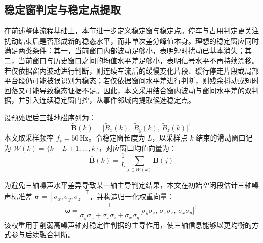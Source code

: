 \documentclass{xdupgthesis}
\begin{document}
\subsection{稳定窗判定与稳定点提取}
\label{subsec:ch4_stable}

在前述整体流程基础上，本节进一步定义稳定窗与稳定点。停车与占用判定更关注扰动结束后是否形成新的稳态水平，而非单次差分峰值本身。理想的稳定窗应同时满足两类条件：其一，当前窗口内部波动足够小，表明短时扰动已基本消失；其二，当前窗口与历史窗口之间的均值水平差足够小，表明信号水平不再持续漂移。若仅依据窗内波动进行判断，则连续车流后的缓慢变化片段、缓行停走片段或局部平台段仍可能被误识别为稳态；若仅依据窗间水平差进行判断，则残余抖动或短时回落又可能导致稳态证据不足。因此，本文采用结合窗内波动与窗间水平差的双判据，并引入连续稳定窗门控，从事件邻域内提取候选稳定点。

设预处理后三轴地磁序列为：
\begin{equation}
    \widetilde{\mathbf{B}}(k)=\big[\widetilde{B}_x(k),\,\widetilde{B}_y(k),\,\widetilde{B}_z(k)\big]^{\mathsf{T}}
\end{equation}
本文取采样频率 $f_s=50\,\mathrm{Hz}$。令稳定窗长度为 $L$，以采样点 $k$ 结束的滑动窗口记为 $\mathcal{W}(k)=\{k-L+1,\ldots,k\}$，对应窗口均值向量为：
\begin{equation}
    \overline{\mathbf{B}}(k)=\frac{1}{L}\sum_{j\in\mathcal{W}(k)}\widetilde{\mathbf{B}}(j)
\end{equation}

为避免三轴噪声水平差异导致某一轴主导判定结果，本文在初始空闲段估计三轴噪声标准差 $\boldsymbol{\sigma}=[\sigma_x,\sigma_y,\sigma_z]^{\mathsf{T}}$，并构造归一化权重向量：
\begin{equation}
    \boldsymbol{\omega}=\frac{1}{\sigma_y\sigma_z+\sigma_x\sigma_z+\sigma_x\sigma_y}
    \big[\sigma_y\sigma_z,\,\sigma_x\sigma_z,\,\sigma_x\sigma_y\big]^{\mathsf{T}}
\end{equation}
该权重用于削弱高噪声轴对稳定性判据的主导作用，使三轴信息能够以更均衡的方式参与后续融合判断。
\end{document}
